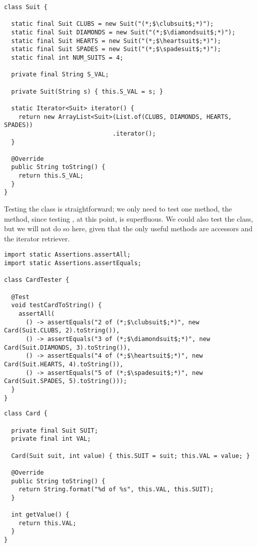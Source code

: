 \enlargethispage{-3\baselineskip}
\begin{lstlisting}[language=MyJava]
class Suit {

  static final Suit CLUBS = new Suit("(*;$\clubsuit$;*)");
  static final Suit DIAMONDS = new Suit("(*;$\diamondsuit$;*)");
  static final Suit HEARTS = new Suit("(*;$\heartsuit$;*)");
  static final Suit SPADES = new Suit("(*;$\spadesuit$;*)");
  static final int NUM_SUITS = 4;

  private final String S_VAL;

  private Suit(String s) { this.S_VAL = s; }

  static Iterator<Suit> iterator() {
    return new ArrayList<Suit>(List.of(CLUBS, DIAMONDS, HEARTS, SPADES))
                              .iterator();
  }

  @Override
  public String toString() { 
    return this.S_VAL; 
  }
}
\end{lstlisting}

Testing the  class is straightforward; we only need to test one method, the  method, since testing , at this point, is superfluous. 
We could also test the  class, but we will not do so here, given that the only useful methods are accessors and the iterator retriever.

\begin{lstlisting}[language=MyJava]
import static Assertions.assertAll;
import static Assertions.assertEquals;

class CardTester {

  @Test
  void testCardToString() {
    assertAll(
      () -> assertEquals("2 of (*;$\clubsuit$;*)", new Card(Suit.CLUBS, 2).toString()),
      () -> assertEquals("3 of (*;$\diamondsuit$;*)", new Card(Suit.DIAMONDS, 3).toString()),
      () -> assertEquals("4 of (*;$\heartsuit$;*)", new Card(Suit.HEARTS, 4).toString()),
      () -> assertEquals("5 of (*;$\spadesuit$;*)", new Card(Suit.SPADES, 5).toString()));
  }
}
\end{lstlisting}

\enlargethispage{1\baselineskip}
\begin{lstlisting}[language=MyJava]
class Card {

  private final Suit SUIT;
  private final int VAL;

  Card(Suit suit, int value) { this.SUIT = suit; this.VAL = value; }
  
  @Override
  public String toString() { 
    return String.format("%d of %s", this.VAL, this.SUIT); 
  }

  int getValue() { 
    return this.VAL; 
  } 
}
\end{lstlisting}

